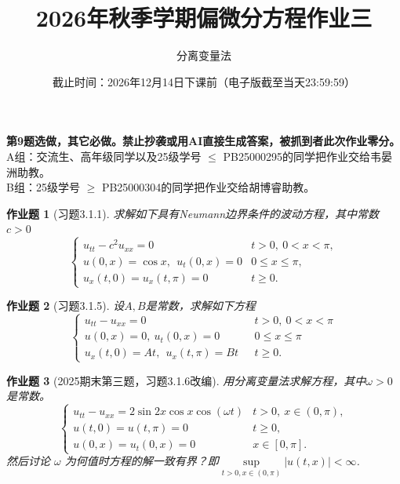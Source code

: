\documentclass[UTF8,fontset=windows,12pt]{ctexart}
\theoremstyle{kaiti-theorem}
\newtheorem{problem}{作业题}
\numberwithin{equation}{section}
\begin{document}
\title{\LARGE{\bf  2026年秋季学期偏微分方程作业三}}
\author{分离变量法}
\date{截止时间：2026年12月14日下课前（电子版截至当天23:59:59）}

\maketitle

\textbf{第9题选做，其它必做。禁止抄袭或用AI直接生成答案，被抓到者此次作业零分。}\\
A组：交流生、高年级同学以及25级学号 $\leqslant$ PB25000295的同学把作业交给韦晏洲助教。\\
B组：25级学号 $\geqslant$ PB25000304的同学把作业交给胡博睿助教。

\begin{problem}[习题3.1.1]
求解如下具有Neumann边界条件的波动方程，其中常数 $c>0$
\[
\begin{cases}
u_{tt}-c^2u_{xx}=0&t>0,~0<x<\pi,\\
u(0,x)=\cos x,~~u_t(0,x)=0& 0\leqslant x\leqslant \pi,\\
u_x(t,0)=u_x(t,\pi)=0& t\geqslant 0.
\end{cases}
\]
\end{problem}

\begin{problem}[习题3.1.5]
设$A,B$是常数，求解如下方程
\[
\begin{cases}
u_{tt}-u_{xx}=0&~~~t>0,~0<x<\pi\\
u(0,x)=0,~u_t(0,x)=0&~~~0\leqslant x\leqslant \pi\\
u_x(t,0)=At,~~u_x(t,\pi)=Bt&~~~t\geqslant 0.
\end{cases}
\]
\end{problem}


\begin{problem}[2025期末第三题，习题3.1.6改编]
 用分离变量法求解方程，其中$\omega>0$是常数。
    \[
    \begin{cases}
        u_{tt}-u_{xx}=2\sin 2x\cos x \cos(\omega t) &t>0,~x\in(0,\pi),\\
        u(t,0)=u(t,\pi)=0&t\geqslant 0,\\
         u(0,x)=u_t(0,x)=0&x\in [0,\pi].
    \end{cases}
    \]然后讨论 $\omega$ 为何值时方程的解一致有界？即$\sup\limits_{t>0,x\in(0,\pi)}|u(t,x)|< \infty$.
\end{problem}
\end{document}
